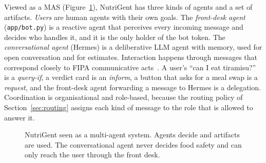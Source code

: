 \documentclass[11pt,a4paper]{article}
\begin{document}
Viewed as a MAS (Figure~\ref{fig:mas}), NutriGent has three kinds of agents and a set of artifacts.
\emph{Users} are human agents with their own goals. The \emph{front-desk agent} (\texttt{app/bot.py}) is
a reactive agent that perceives every incoming message and decides who handles it, and it is the only
holder of the bot token. The \emph{conversational agent} (Hermes) is a deliberative LLM agent with
memory, used for open conversation and for estimates. Interaction happens through messages that
correspond closely to FIPA communicative acts~\cite{fipa2002}. A user's ``can I eat tiramisu?'' is a
\emph{query-if}, a verdict card is an \emph{inform}, a button that asks for a meal swap is a
\emph{request}, and the front-desk agent forwarding a message to Hermes is a delegation. Coordination is
organisational and role-based, because the routing policy of Section~\ref{sec:routing} assigns each
kind of message to the role that is allowed to answer it.

\begin{figure}[H]
\centering
{}
\caption{NutriGent seen as a multi-agent system. Agents decide and artifacts are used. The
conversational agent never decides food safety and can only reach the user through the front desk.}
\label{fig:mas}
\end{figure}
\end{document}
